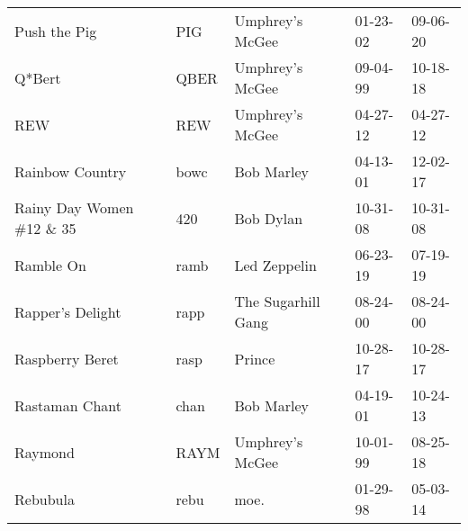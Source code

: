 \begin{longtable}{p{}p{}p{}p{}p{}}
                                                            Push the Pig &           PIG &                                          Umphrey's McGee &              01-23-02 &             09-06-20 \\
                                                                  Q*Bert &          QBER &                                          Umphrey's McGee &              09-04-99 &             10-18-18 \\
                                                                     REW &           REW &                                          Umphrey's McGee &              04-27-12 &             04-27-12 \\
                                                         Rainbow Country &          bowc &                                               Bob Marley &              04-13-01 &             12-02-17 \\
                                              Rainy Day Women \#12 \& 35 &           420 &                                                Bob Dylan &              10-31-08 &             10-31-08 \\
                                                               Ramble On &          ramb &                                             Led Zeppelin &              06-23-19 &             07-19-19 \\
                                                        Rapper's Delight &          rapp &                                       The Sugarhill Gang &              08-24-00 &             08-24-00 \\
                                                         Raspberry Beret &          rasp &                                                   Prince &              10-28-17 &             10-28-17 \\
                                                          Rastaman Chant &          chan &                                               Bob Marley &              04-19-01 &             10-24-13 \\
                                                                 Raymond &          RAYM &                                          Umphrey's McGee &              10-01-99 &             08-25-18 \\
                                                                Rebubula &          rebu &                                                     moe. &              01-29-98 &             05-03-14 \\

\end{longtable}
